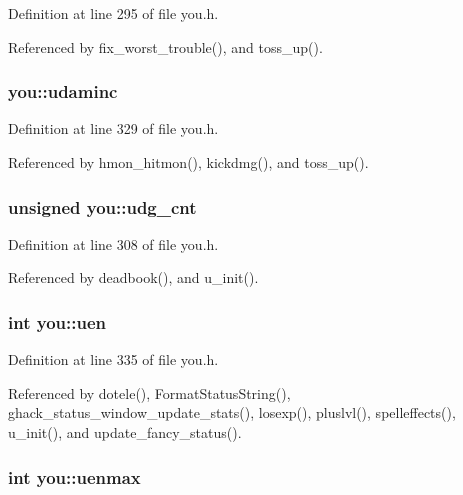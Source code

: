 Definition at line 295 of file you.\+h.



Referenced by fix\+\_\+worst\+\_\+trouble(), and toss\+\_\+up().

\hypertarget{structyou_ae7c0602a1e4514ff0f22039746957799}{
\subsubsection[{udaminc}]{ you\+::udaminc}}\label{structyou_ae7c0602a1e4514ff0f22039746957799}


Definition at line 329 of file you.\+h.



Referenced by hmon\+\_\+hitmon(), kickdmg(), and toss\+\_\+up().

\hypertarget{structyou_a57a2b161db463d1534dd5b71e9ff79b6}{
\subsubsection[{udg\+\_\+cnt}]{\setlength{\rightskip}{0pt plus 5cm}unsigned you\+::udg\+\_\+cnt}}\label{structyou_a57a2b161db463d1534dd5b71e9ff79b6}


Definition at line 308 of file you.\+h.



Referenced by deadbook(), and u\+\_\+init().

\hypertarget{structyou_a3c465c4017dafc312188046dde2fc080}{
\subsubsection[{uen}]{\setlength{\rightskip}{0pt plus 5cm}int you\+::uen}}\label{structyou_a3c465c4017dafc312188046dde2fc080}


Definition at line 335 of file you.\+h.



Referenced by dotele(), Format\+Status\+String(), ghack\+\_\+status\+\_\+window\+\_\+update\+\_\+stats(), losexp(), pluslvl(), spelleffects(), u\+\_\+init(), and update\+\_\+fancy\+\_\+status().

\hypertarget{structyou_aed246159794c7c780aeea2aca5adabe8}{
\subsubsection[{uenmax}]{\setlength{\rightskip}{0pt plus 5cm}int you\+::uenmax}}\label{structyou_aed246159794c7c780aeea2aca5adabe8}


